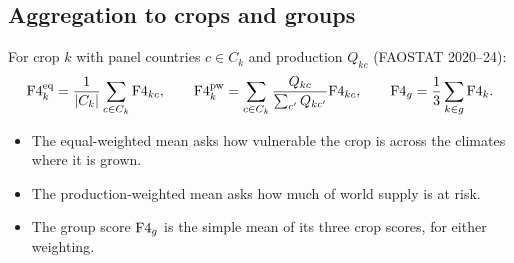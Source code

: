 \subsection{Aggregation to crops and groups}\label{sec:aggregation}
For crop $k$ with panel countries $c\in C_k$ and production $Q_{kc}$ (FAOSTAT 2020--24):
\begin{equation}\label{eq:agg}
\mathrm{F4}^{\text{eq}}_k = \frac{1}{|C_k|}\sum_{c\in C_k}\mathrm{F4}_{kc},\qquad
\mathrm{F4}^{\text{pw}}_k = \sum_{c\in C_k}\frac{Q_{kc}}{\sum_{c'}Q_{kc'}}\mathrm{F4}_{kc},\qquad
\mathrm{F4}_g = \frac13\sum_{k\in g}\mathrm{F4}_k .
\end{equation}
\begin{itemize}
\item The equal-weighted mean asks how vulnerable the crop is across the climates where it is grown.
\item The production-weighted mean asks how much of world supply is at risk.
\item The group score $\mathrm{F4}_g$ is the simple mean of its three crop scores, for either weighting.
\end{itemize}
